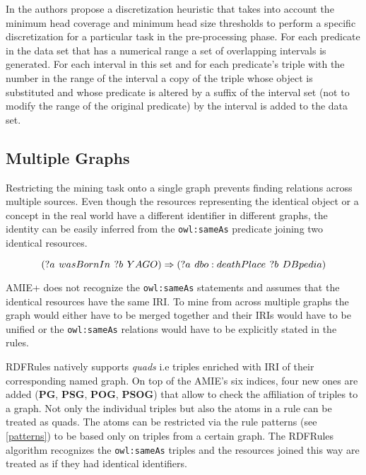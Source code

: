 In \cite{Zeman2020} the authors propose a discretization heuristic that takes into account the minimum head coverage and minimum head size thresholds to perform a specific discretization for a particular task in the pre-processing phase. For each predicate in the data set that has a numerical range a set of overlapping intervals is generated. For each interval in this set and for each predicate's triple with the number in the range of the interval a copy of the triple whose object is substituted and whose predicate is altered by a suffix of the interval set (not to modify the range of the original predicate) by the interval is added to the data set.   

\subsection{Multiple Graphs}

Restricting the mining task onto a single graph prevents finding relations across multiple sources. Even though the resources representing the identical object or a concept in the real world have a different identifier in different graphs, the identity can be easily inferred from the \verb|owl:sameAs| predicate joining two identical resources.

$$(?a \hspace{0.4em} wasBornIn \hspace{0.4em} ?b \hspace{0.4em} YAGO) \Rightarrow (?a \hspace{0.4em} dbo:deathPlace \hspace{0.4em} ?b \hspace{0.4em}  DBpedia )$$

AMIE+ does not recognize the \verb|owl:sameAs| statements and assumes that the identical resources have the same IRI. To mine from across multiple graphs the graph would either have to be merged together and their IRIs would have to be unified or the \verb|owl:sameAs| relations would have to be explicitly stated in the rules.

RDFRules natively supports \textit{quads} i.e triples enriched with IRI of their corresponding named graph. On top of the AMIE's six indices, four new ones are added (\textbf{PG}, \textbf{PSG}, \textbf{POG}, \textbf{PSOG}) that allow to check the affiliation of triples to a graph. Not only the individual triples but also the atoms in a rule can be treated as quads. The atoms can be restricted via the rule patterns (see \ref{patterns}) to be based only on triples from a certain graph. The RDFRules algorithm recognizes the \verb|owl:sameAs| triples and the resources joined this way are treated as if they had identical identifiers.

